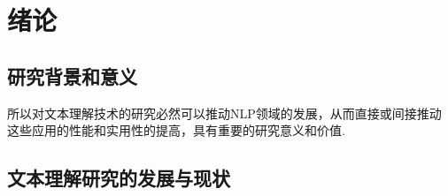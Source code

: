 \documentclass[bachelor,adobefonts]{jnuthesis}
\begin{document}
\tableofcontents

\mainmatter


\chapter{绪论}\label{chapter_introduction}
\section{研究背景和意义}



所以对文本理解技术的研究必然可以推动NLP领域的发展，从而直接或间接推动这些应用的性能和实用性的提高，具有重要的研究意义和价值.

\section{文本理解研究的发展与现状}
\end{document}
